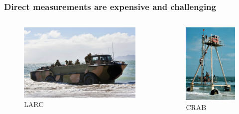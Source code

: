 \documentclass[7pt]{beamer}
\begin{document}
\begin{frame}
    \frametitle{Direct measurements are expensive and challenging}

    \begin{columns}
    
            \centering
            \begin{figure}[h!]
                \includegraphics[width=1\linewidth]{img/LARC2.jpg}\hfill
                \centering
                \captionsetup{labelformat=empty}
                \caption{LARC}
            \end{figure}
        
            \begin{figure}[h]
                \includegraphics[width=0.8\linewidth]{img/CRAB3.JPG}
                \captionsetup{labelformat=empty}
                \caption{CRAB}
            \end{figure}
    

\end{columns}
\end{frame}
\end{document}

